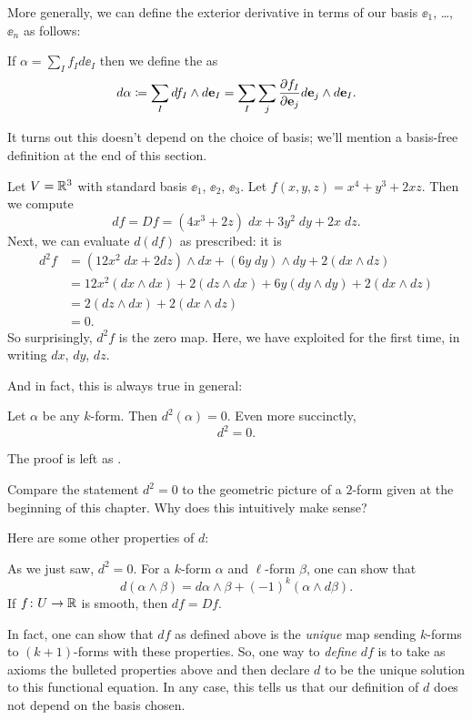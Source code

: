 More generally, we can define the exterior derivative
in terms of our basis $\ee_1$, \dots, $\ee_n$ as follows:
\begin{definition}
If $\alpha = \sum_I f_I d\ee_I$ then we define the  as
\[ d\alpha \coloneqq \sum_I df_I \wedge d\mathbf e_I
	= \sum_I \sum_j \frac{\partial f_I}{\partial \mathbf e_j} d\mathbf e_j \wedge d\mathbf e_I. \]
\label{def:exterior_derivative}
\end{definition}
It turns out this doesn't depend on the choice of basis;
we'll mention a basis-free definition at the end of this section.

\begin{example}
	Let $V = \mathbb R^3$ with standard basis $\ee_1$, $\ee_2$, $\ee_3$.
	Let $f(x,y,z) = x^4 + y^3 + 2xz$.
	Then we compute
	\[ df = Df = (4x^3+2z) \; dx + 3y^2 \; dy + 2x \; dz. \]
	Next, we can evaluate $d(df)$ as prescribed: it is
	\begin{align*}
		d^2f &= (12x^2 \; dx + 2 dz) \wedge dx + (6y \; dy) \wedge dy
		+ 2(dx \wedge dz) \\
		&= 12x^2 (dx \wedge dx) + 2(dz \wedge dx) + 6y (dy \wedge dy) + 2(dx \wedge dz) \\
		&= 2(dz \wedge dx) + 2(dx \wedge dz) \\
		&= 0.
	\end{align*}
	So surprisingly, $d^2f$ is the zero map.
	Here, we have exploited  for the first time,
	in writing $dx$, $dy$, $dz$.
\end{example}
And in fact, this is always true in general:
\begin{theorem}
	\label{thm:dd_zero}
	Let $\alpha$ be any $k$-form.
	Then $d^2(\alpha) = 0$.
	Even more succinctly, \[ d^2 = 0. \]
\end{theorem}
The proof is left as .
\begin{exercise}
	Compare the statement $d^2 = 0$ to the geometric
	picture of a $2$-form given at the beginning of this chapter.
	Why does this intuitively make sense?
\end{exercise}

Here are some other properties of $d$:
\begin{itemize}
	\ii As we just saw, $d^2 = 0$.
	\ii For a $k$-form $\alpha$ and $\ell$-form $\beta$, one can show that
	\[ d(\alpha \wedge \beta) = d\alpha \wedge \beta + (-1)^k (\alpha \wedge d\beta). \]
	\ii If $f \colon U \to \mathbb R$ is smooth, then $df = Df$.
\end{itemize}
In fact, one can show that $df$ as defined above is
the \emph{unique} map sending $k$-forms to $(k+1)$-forms
with these properties.
So, one way to \emph{define} $df$ is to take as axioms
the bulleted properties above
and then declare $d$ to be the unique solution to this functional equation.
In any case, this tells us that our definition of $d$
does not depend on the basis chosen.

